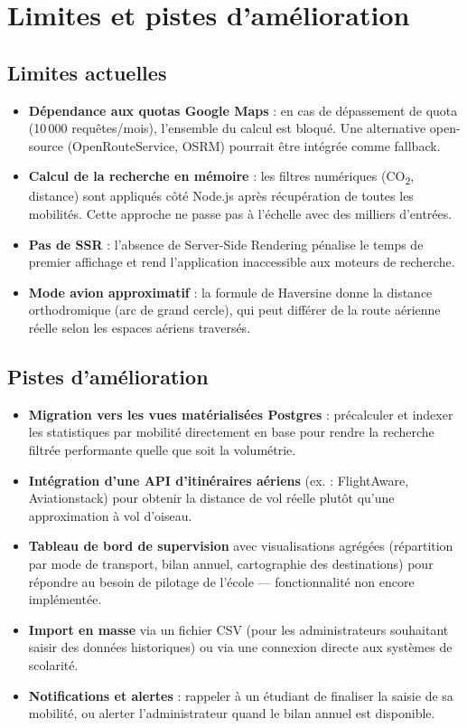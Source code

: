 \documentclass[11pt,a4paper]{article}
\begin{document}
\section{Limites et pistes d'amélioration}

\subsection{Limites actuelles}

\begin{itemize}
  \item \textbf{Dépendance aux quotas Google Maps} : en cas de dépassement de quota (10\,000 requêtes/mois), l'ensemble du calcul est bloqué. Une alternative open-source (OpenRouteService, OSRM) pourrait être intégrée comme fallback.
  \item \textbf{Calcul de la recherche en mémoire} : les filtres numériques (CO\textsubscript{2}, distance) sont appliqués côté Node.js après récupération de toutes les mobilités. Cette approche ne passe pas à l'échelle avec des milliers d'entrées.
  \item \textbf{Pas de SSR} : l'absence de Server-Side Rendering pénalise le temps de premier affichage et rend l'application inaccessible aux moteurs de recherche.
  \item \textbf{Mode avion approximatif} : la formule de Haversine donne la distance orthodromique (arc de grand cercle), qui peut différer de la route aérienne réelle selon les espaces aériens traversés.
\end{itemize}

\subsection{Pistes d'amélioration}

\begin{itemize}
  \item \textbf{Migration vers les vues matérialisées Postgres} : précalculer et indexer les statistiques par mobilité directement en base pour rendre la recherche filtrée performante quelle que soit la volumétrie.
  \item \textbf{Intégration d'une API d'itinéraires aériens} (ex. : FlightAware, Aviationstack) pour obtenir la distance de vol réelle plutôt qu'une approximation à vol d'oiseau.
  \item \textbf{Tableau de bord de supervision} avec visualisations agrégées (répartition par mode de transport, bilan annuel, cartographie des destinations) pour répondre au besoin de pilotage de l'école — fonctionnalité non encore implémentée.
  \item \textbf{Import en masse} via un fichier CSV (pour les administrateurs souhaitant saisir des données historiques) ou via une connexion directe aux systèmes de scolarité.
  \item \textbf{Notifications et alertes} : rappeler à un étudiant de finaliser la saisie de sa mobilité, ou alerter l'administrateur quand le bilan annuel est disponible.
\end{itemize}
\end{document}
